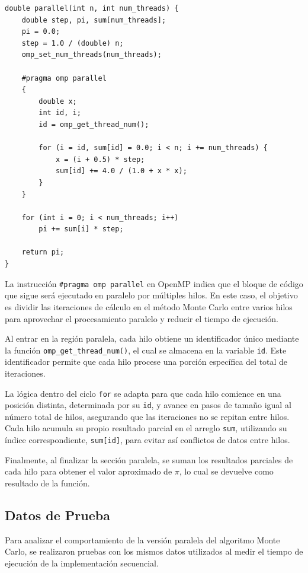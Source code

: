 \documentclass[a4paper, 10pt]{IEEEtran}
\begin{document}
\begin{lstlisting}[caption={Implementación Paralela de Monte Carlo en C++}, label={lst:parallel}]
double parallel(int n, int num_threads) {
	double step, pi, sum[num_threads];
	pi = 0.0;
	step = 1.0 / (double) n;
	omp_set_num_threads(num_threads);
	
	#pragma omp parallel
	{
		double x;
		int id, i;
		id = omp_get_thread_num();
		
		for (i = id, sum[id] = 0.0; i < n; i += num_threads) {
			x = (i + 0.5) * step;
			sum[id] += 4.0 / (1.0 + x * x);
		}
	}
	
	for (int i = 0; i < num_threads; i++)
		pi += sum[i] * step;

	return pi;
}
\end{lstlisting}

La instrucción \texttt{\#pragma omp parallel} en OpenMP indica que el bloque de código que sigue será ejecutado en paralelo por múltiples hilos. En este caso, el objetivo es dividir las iteraciones de cálculo en el método Monte Carlo entre varios hilos para aprovechar el procesamiento paralelo y reducir el tiempo de ejecución.

Al entrar en la región paralela, cada hilo obtiene un identificador único mediante la función \texttt{omp\_get\_thread\_num()}, el cual se almacena en la variable \texttt{id}. Este identificador permite que cada hilo procese una porción específica del total de iteraciones.

La lógica dentro del ciclo \texttt{for} se adapta para que cada hilo comience en una posición distinta, determinada por su \texttt{id}, y avance en pasos de tamaño igual al número total de hilos, asegurando que las iteraciones no se repitan entre hilos. Cada hilo acumula su propio resultado parcial en el arreglo \texttt{sum}, utilizando su índice correspondiente, \texttt{sum[id]}, para evitar así conflictos de datos entre hilos.

Finalmente, al finalizar la sección paralela, se suman los resultados parciales de cada hilo para obtener el valor aproximado de $\pi$, lo cual se devuelve como resultado de la función.

\subsection{Datos de Prueba}
Para analizar el comportamiento de la versión paralela del algoritmo Monte Carlo, se realizaron pruebas con los mismos datos utilizados al medir el tiempo de ejecución de la implementación secuencial.
\end{document}
